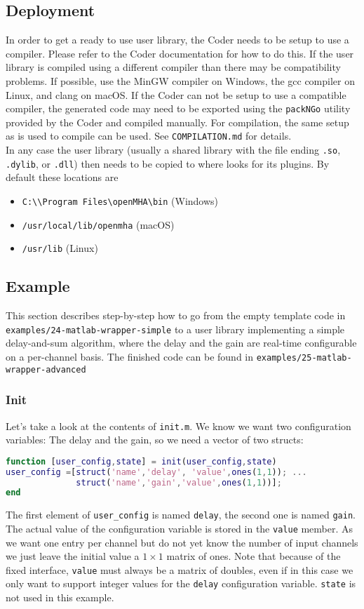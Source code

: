 \documentclass[11pt,a4paper,twoside]{article}
\newcommand{\+}{\discretionary{\mbox{\scriptsize$\hookleftarrow$}}{}{}}
\begin{document}
\subsection{Deployment}
\label{subsec:Deployment}
In order to get a ready to use user library, the \Matlab{} Coder needs to be
setup to use a compiler. Please refer to the \Matlab{} Coder documentation for
how to do this. If the user library is compiled using a different compiler than
\mha{} there may be compatibility problems. If possible, use the MinGW
compiler on Windows, the gcc compiler on Linux, and clang on macOS. If the \Matlab{} Coder
can not be setup to use a compatible compiler, the generated code may need to be
exported using the \texttt{packNGo} utility provided by the \Matlab{} Coder and
compiled manually. For compilation, the same setup as is used to compile \mha{}
can be used. See \texttt{COMPILATION.md} for details. \\
In any case the user library (usually a shared library with the file ending
\texttt{.so}, \texttt{.dylib}, or \texttt{.dll}) then needs to be copied to where
\mha{} looks for its plugins. By default these locations are
\begin{itemize}
\item \texttt{C:\textbackslash\textbackslash Program Files\textbackslash openMHA\textbackslash bin} (Windows)
\item \texttt{/usr/local/lib/openmha} (macOS)
\item \texttt{/usr/lib} (Linux)
\end{itemize}
\subsection{Example}
This section describes step-by-step how to go from the empty template code
in \\ \texttt{examples/24-matlab-wrapper-simple}
to a user library implementing a simple delay-and-sum algorithm, where the delay
and the gain are real-time configurable on a per-channel basis.
The finished code can be found in \texttt{examples/25-matlab-wrapper-advanced}
\subsubsection*{Init}
Let's take a look at the contents of \texttt{init.m}. We know we want two
configuration variables:
The delay and the gain, so we need a vector of two structs:
\begin{lstlisting}[language=Matlab]
function [user_config,state] = init(user_config,state)
user_config =[struct('name','delay', 'value',ones(1,1)); ...
              struct('name','gain','value',ones(1,1))];
end
\end{lstlisting}
The first element of \texttt{user\_config} is named \texttt{delay}, the second one is named
\texttt{gain}. The actual value of the configuration variable is stored in the \texttt{value}
member. As we want one entry per channel but do not yet know the number of input
channels we just leave the initial value a $1\times1$ matrix of ones. Note that because of
the fixed interface, \texttt{value} must always be a matrix of doubles, even if in this
case we only want to support integer values for the \texttt{delay} configuration
variable. \texttt{state} is not used in this example.
\end{document}
